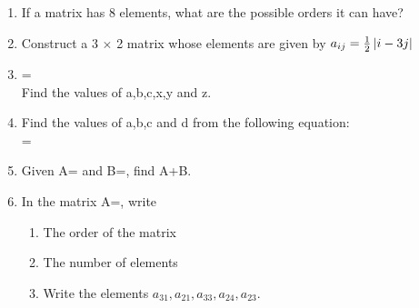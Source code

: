 \documentclass[journal,12pt,twocolumn]{IEEEtran}
\renewcommand\thesection{\arabic{section}}
\begin{document}
\begin{enumerate}[label=\thesection.\arabic*.,ref=\thesection.\theenumi]
 \item  If a matrix has 8 elements, what are the possible orders it can have?\\
    \item Construct a 3 $\times$ 2 matrix whose elements are given by $a_{ij}=\frac{1}{2}\left\vert i-3j\right\vert$\\
    \item {}=\\
    Find the values of a,b,c,x,y and z.\\
\solution 

    \item Find the values of a,b,c and d from the following equation:\\
    =\\
\solution 

    \item Given A= and B=, find A+B.\\\solution 

\item In the matrix A=, write
\begin{enumerate}
\item The order of the matrix
\item The number of elements
\item Write the elements $a_{31},a_{21},a_{33},a_{24},a_{23}.$
\end{enumerate}
\solution 



\end{enumerate}
\end{document}
